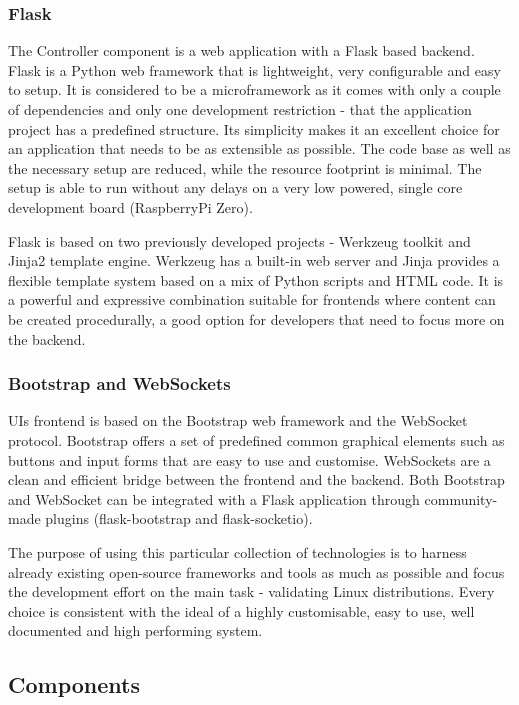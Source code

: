 \subsubsection*{Flask}
The Controller component is a web application with a Flask based backend. Flask is a Python web framework that is lightweight, very configurable and easy to setup. It is considered to be a microframework as it comes with only a couple of dependencies and only one development restriction - that the application project has a predefined structure. Its simplicity makes it an excellent choice for an application that needs to be as extensible as possible. The code base as well as the necessary setup are reduced, while the resource footprint is minimal. The setup is able to run without any delays on a very low powered, single core development board (RaspberryPi Zero).

Flask is based on two previously developed projects - Werkzeug toolkit and Jinja2 template engine. Werkzeug has a built-in web server and Jinja provides a flexible template system based on a mix of Python scripts and HTML code. It is a powerful and expressive combination suitable for frontends where content can be created procedurally, a good option for developers that need to focus more on the backend.

\subsubsection*{Bootstrap and WebSockets}
UIs frontend is based on the Bootstrap web framework and the WebSocket protocol. Bootstrap offers a set of predefined common graphical elements such as buttons and input forms that are easy to use and customise. WebSockets are a clean and efficient bridge between the frontend and the backend. Both Bootstrap and WebSocket can be integrated with a Flask application through community-made plugins (flask-bootstrap and flask-socketio).

\vspace{7mm}

The purpose of using this particular collection of technologies is to harness already existing open-source frameworks and tools as much as possible and focus the development effort on the main task - validating Linux distributions. Every choice is consistent with the ideal of a highly customisable, easy to use, well documented and high performing system.

\subsection{Components}

